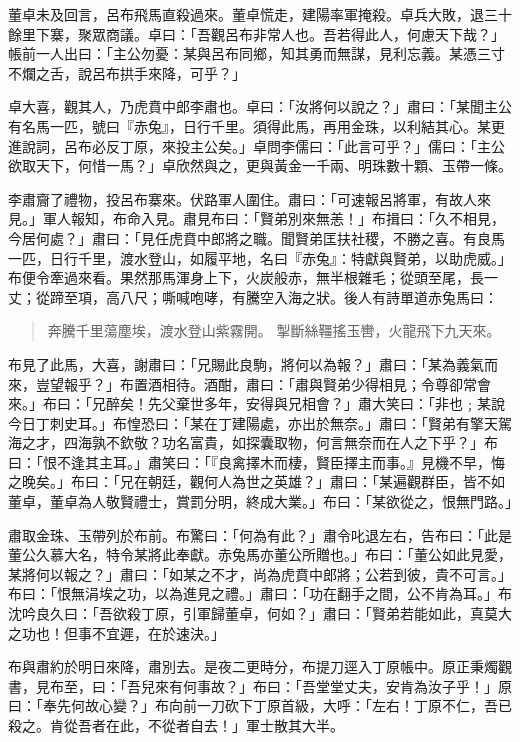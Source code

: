 董卓未及回言，呂布飛馬直殺過來。董卓慌走，建陽率軍掩殺。卓兵大敗，退三十餘里下寨，聚眾商議。卓曰：「吾觀呂布非常人也。吾若得此人，何慮天下哉？」帳前一人出曰：「主公勿憂：某與呂布同鄉，知其勇而無謀，見利忘義。某憑三寸不爛之舌，說呂布拱手來降，可乎？」

卓大喜，觀其人，乃虎賁中郎李肅也。卓曰：「汝將何以說之？」肅曰：「某聞主公有名馬一匹，號曰『赤兔』，日行千里。須得此馬，再用金珠，以利結其心。某更進說詞，呂布必反丁原，來投主公矣。」卓問李儒曰：「此言可乎？」儒曰：「主公欲取天下，何惜一馬？」卓欣然與之，更與黃金一千兩、明珠數十顆、玉帶一條。

李肅齎了禮物，投呂布寨來。伏路軍人圍住。肅曰：「可速報呂將軍，有故人來見。」軍人報知，布命入見。肅見布曰：「賢弟別來無恙！」布揖曰：「久不相見，今居何處？」肅曰：「見任虎賁中郎將之職。聞賢弟匡扶社稷，不勝之喜。有良馬一匹，日行千里，渡水登山，如履平地，名曰『赤兔』：特獻與賢弟，以助虎威。」布便令牽過來看。果然那馬渾身上下，火炭般赤，無半根雜毛；從頭至尾，長一丈；從蹄至項，高八尺；嘶喊咆哮，有騰空入海之狀。後人有詩單道赤兔馬曰：

\begin{quote}
奔騰千里蕩塵埃，渡水登山紫霧開。
掣斷絲韁搖玉轡，火龍飛下九天來。
\end{quote}

布見了此馬，大喜，謝肅曰：「兄賜此良駒，將何以為報？」肅曰：「某為義氣而來，豈望報乎？」布置酒相待。酒酣，肅曰：「肅與賢弟少得相見；令尊卻常會來。」布曰：「兄醉矣！先父棄世多年，安得與兄相會？」肅大笑曰：「非也﹔某說今日丁刺史耳。」布惶恐曰：「某在丁建陽處，亦出於無奈。」肅曰：「賢弟有擎天駕海之才，四海孰不欽敬？功名富貴，如探囊取物，何言無奈而在人之下乎？」布曰：「恨不逢其主耳。」肅笑曰：「『良禽擇木而棲，賢臣擇主而事。』見機不早，悔之晚矣。」布曰：「兄在朝廷，觀何人為世之英雄？」肅曰：「某遍觀群臣，皆不如董卓，董卓為人敬賢禮士，賞罰分明，終成大業。」布曰：「某欲從之，恨無門路。」

肅取金珠、玉帶列於布前。布驚曰：「何為有此？」肅令叱退左右，告布曰：「此是董公久慕大名，特令某將此奉獻。赤兔馬亦董公所贈也。」布曰：「董公如此見愛，某將何以報之？」肅曰：「如某之不才，尚為虎賁中郎將；公若到彼，貴不可言。」布曰：「恨無涓埃之功，以為進見之禮。」肅曰：「功在翻手之間，公不肯為耳。」布沈吟良久曰：「吾欲殺丁原，引軍歸董卓，何如？」肅曰：「賢弟若能如此，真莫大之功也！但事不宜遲，在於速決。」

布與肅約於明日來降，肅別去。是夜二更時分，布提刀逕入丁原帳中。原正秉燭觀書，見布至，曰：「吾兒來有何事故？」布曰：「吾堂堂丈夫，安肯為汝子乎！」原曰：「奉先何故心變？」布向前一刀砍下丁原首級，大呼：「左右！丁原不仁，吾已殺之。肯從吾者在此，不從者自去！」軍士散其大半。

